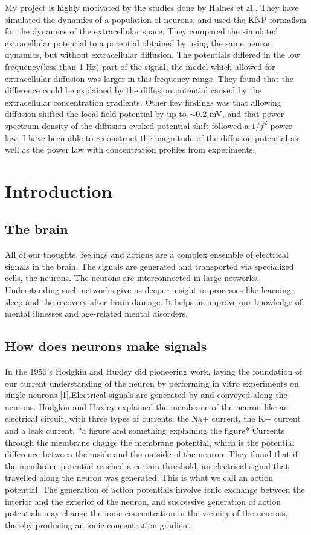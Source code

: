 \documentclass{article}
\begin{document}
My project is highly motivated by the studies done by Halnes et al.. They have simulated the dynamics of a population of neurons, and used the KNP formalism for the dynamics of the extracellular space. They compared the simulated extracellular potential to a potential obtained by using the same neuron dynamics, but without extracellular diffusion. The potentials differed in the low frequency(less than 1 Hz) part of the signal, the model which allowed for extracellular diffusion was larger in this frequency range. They found that the difference could be explained by the diffusion potential caused by the extracellular concentration gradients. Other key findings was that allowing diffusion shifted the local field potential by up to $\sim 0.2$ mV, and that power spectrum density of the diffusion evoked potential shift followed a $1/f^2$ power law. I have been able to reconstruct the magnitude of the diffusion potential as well as the power law with concentration profiles from experiments. 

\section{Introduction}\label{Introduction}
\subsection{The brain}
All of our thoughts, feelings and actions are a complex ensemble of electrical signals in the brain. The signals are generated and transported via specialized cells, the neurons. The neurons are interconnected in large networks. Understanding such networks give us deeper insight in processes like learning, sleep and the recovery after brain damage. It helps us improve our knowledge of mental illnesses and age-related mental disorders.
\subsection{How does neurons make signals}
In the 1950’s Hodgkin and Huxley did pioneering work, laying the foundation of our current understanding of the neuron by performing in vitro experiments on single neurons [1].Electrical signals are generated by and conveyed along the neurons. Hodgkin and Huxley explained the membrane of the neuron like an electrical circuit, with three types of currents: the Na+ current, the K+ current and a leak current. *a figure and something explaining the figure* Currents through the membrane change the membrane potential, which is the potential difference between the inside and the outside of the neuron. They found that if the membrane potential reached a certain threshold, an electrical signal that travelled along the neuron was generated. This is what we call an action potential. The generation of action potentials involve ionic exchange between the interior and the exterior of the neuron, and successive generation of action potentials may change the ionic concentration in the vicinity of the neurons, thereby producing an ionic concentration gradient.
\end{document}
